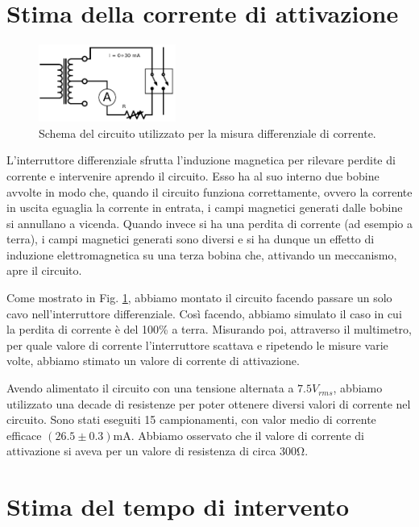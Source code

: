 \section{Stima della corrente di attivazione}

\begin{figure}
	\centering
    \includegraphics[width=0.40\textwidth]{amper.pdf}
    \caption{Schema del circuito utilizzato per la misura differenziale di corrente.}
    \label{fig:amper}
\end{figure}

L'interruttore differenziale sfrutta l'induzione magnetica per rilevare perdite di corrente e intervenire aprendo il circuito. Esso ha al suo interno due bobine avvolte in modo che, quando il circuito funziona correttamente, ovvero la corrente in uscita eguaglia la corrente in entrata, i campi magnetici generati dalle bobine si annullano a vicenda. Quando invece si ha una perdita di corrente (ad esempio a terra), i campi magnetici generati sono diversi e si ha dunque un effetto di induzione elettromagnetica su una terza bobina che, attivando un meccanismo, apre il circuito.

Come mostrato in Fig. \ref{fig:amper}, abbiamo montato il circuito facendo passare un solo cavo nell'interruttore differenziale. Così facendo, abbiamo simulato il caso in cui la perdita di corrente è del 100\% a terra. Misurando poi, attraverso il multimetro, per quale valore di corrente l'interruttore scattava e ripetendo le misure varie volte, abbiamo stimato un valore di corrente di attivazione. 

Avendo alimentato il circuito con una tensione alternata a $7.5V_{rms}$, abbiamo utilizzato una decade di resistenze per poter ottenere diversi valori di corrente nel circuito. Sono stati eseguiti 15 campionamenti, con valor medio di corrente efficace $(26.5\pm0.3)\si{\milli\ampere}$. Abbiamo osservato che il valore di corrente di attivazione si aveva per un valore di resistenza di circa $300\si{\ohm}$. 


\section{Stima del tempo di intervento}

